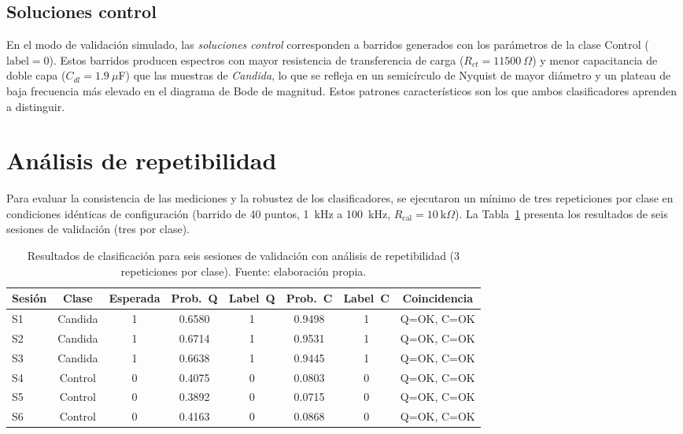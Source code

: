 \documentclass[11pt,a4paper,spanish]{book}
\begin{document}
\subsection{Soluciones control}

En el modo de validaci\'{o}n simulado, las \textit{soluciones control} corresponden a barridos generados con los par\'{a}metros de la clase Control ($\text{label}=0$). Estos barridos producen espectros con mayor resistencia de transferencia de carga ($R_{ct} = 11500~\Omega$) y menor capacitancia de doble capa ($C_{dl} = 1.9~\mu$F) que las muestras de \textit{Candida}, lo que se refleja en un semic\'{i}rculo de Nyquist de mayor di\'{a}metro y un plateau de baja frecuencia m\'{a}s elevado en el diagrama de Bode de magnitud. Estos patrones caracter\'{i}sticos son los que ambos clasificadores aprenden a distinguir.

\section{An\'{a}lisis de repetibilidad}
\label{sec:repetibilidad}

Para evaluar la consistencia de las mediciones y la robustez de los clasificadores, se ejecutaron un m\'{i}nimo de tres repeticiones por clase en condiciones id\'{e}nticas de configuraci\'{o}n (barrido de 40 puntos, 1~kHz a 100~kHz, $R_{\mathrm{cal}} = 10~\text{k}\Omega$). La Tabla~\ref{tab:repetibilidad} presenta los resultados de seis sesiones de validaci\'{o}n (tres por clase).

\begin{table}[ht]
\centering
\scriptsize
\begin{tabular}{l c c c c c c c}
\hline\hline
Sesi\'{o}n & Clase & Esperada & Prob.~Q & Label~Q & Prob.~C & Label~C & Coincidencia \\ [0.5ex]
\hline
S1 & Candida & 1 & 0.6580 & 1 & 0.9498 & 1 & Q=OK, C=OK \\
S2 & Candida & 1 & 0.6714 & 1 & 0.9531 & 1 & Q=OK, C=OK \\
S3 & Candida & 1 & 0.6638 & 1 & 0.9445 & 1 & Q=OK, C=OK \\
S4 & Control & 0 & 0.4075 & 0 & 0.0803 & 0 & Q=OK, C=OK \\
S5 & Control & 0 & 0.3892 & 0 & 0.0715 & 0 & Q=OK, C=OK \\
S6 & Control & 0 & 0.4163 & 0 & 0.0868 & 0 & Q=OK, C=OK \\
\hline
\end{tabular}
\caption[An\'{a}lisis de repetibilidad]{Resultados de clasificaci\'{o}n para seis sesiones de validaci\'{o}n con an\'{a}lisis de repetibilidad (3 repeticiones por clase). Fuente: elaboraci\'{o}n propia.}
\label{tab:repetibilidad}
\end{table}
\end{document}
